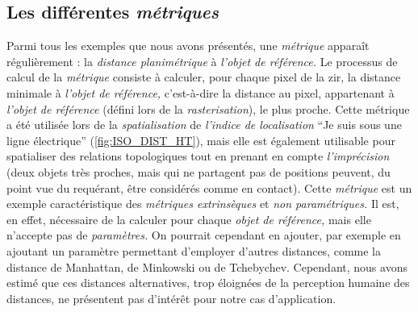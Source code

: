 \subsection{Les différentes \emph{métriques}}

Parmi tous les exemples que nous avons présentés, une \emph{métrique}
apparaît régulièrement : la \emph{distance planimétrique} à
\emph{l'objet de référence.} Le processus de calcul de la
\emph{métrique} consiste à calculer, pour chaque pixel de la \ac{zir},
la distance minimale à \emph{l'objet de référence,} c'est-à-dire la
distance au pixel, appartenant à \emph{l'objet de référence} (défini
lors de la \emph{rasterisation}), le plus proche. Cette métrique a été
utilisée lors de la \emph{spatialisation} de \emph{l'indice de
  localisation} \enquote{Je suis sous une ligne électrique}
(\autoref{fig:ISO_DIST_HT}), mais elle est également utilisable pour
spatialiser des relations topologiques tout en prenant en compte
\emph{l'imprécision} (\eg deux objets très proches, mais qui ne
partagent pas de positions peuvent, du point vue du requérant, être
considérés comme en contact). Cette \emph{métrique} est un exemple
caractéristique des \emph{métriques extrinsèques} et \emph{non
  paramétriques.} Il est, en effet, nécessaire de la calculer pour
chaque \emph{objet de référence,} mais elle n'accepte pas de
\emph{paramètres.}  On pourrait cependant en ajouter, par exemple en
ajoutant un paramètre permettant d'employer d'autres distances, comme
la distance de Manhattan, de Minkowski ou de Tchebychev. Cependant,
nous avons estimé que ces distances alternatives, trop éloignées de la
perception humaine des distances, ne présentent pas d’intérêt pour
notre cas d'application.

